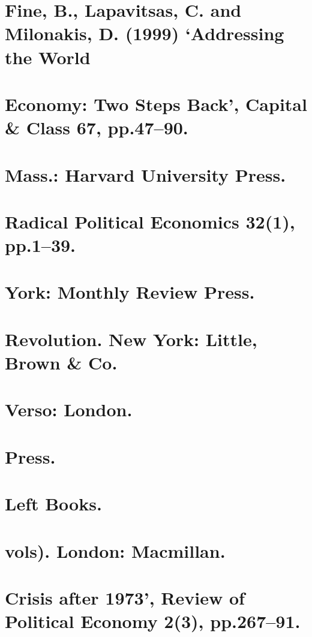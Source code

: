 \section{Fine, B., Lapavitsas, C. and Milonakis, D. (1999) ‘Addressing the World}


\section{Economy: Two Steps Back’, Capital & Class 67, pp.47–90.}


\section{Mass.: Harvard University Press.}


\section{Radical Political Economics 32(1), pp.1–39.}


\section{York: Monthly Review Press.}


\section{Revolution. New York: Little, Brown & Co.}


\section{Verso: London.}


\section{Press.}


\section{Left Books.}


\section{vols). London: Macmillan.}


\section{Crisis after 1973’, Review of Political Economy 2(3), pp.267–91.}


